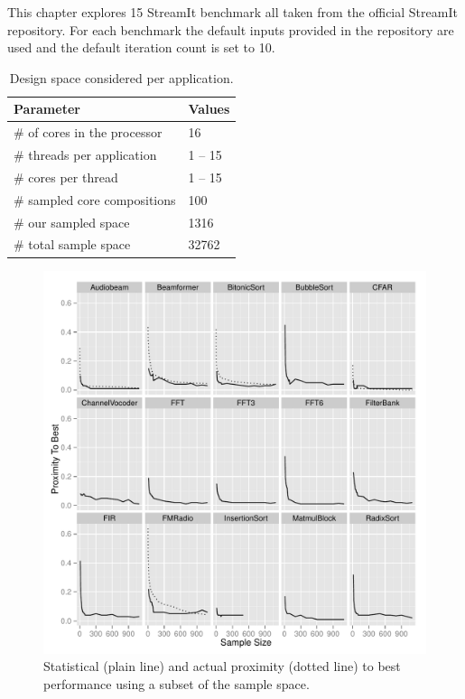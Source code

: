 This chapter explores 15 StreamIt benchmark  all taken from the official StreamIt repository.
For each benchmark the default inputs provided in the repository are used and the default iteration count is set to 10. 
\begin{table}
\centering
\begin{tabular} { p{5.2cm}  p{1.8cm} }
      \toprule
      \textbf{Parameter} & \textbf{Values} \\ \midrule
      \# of cores in the processor & 16 \\
      \# threads per application & 1 -- 15 \\
      \# cores per thread & 1 -- 15 \\ \midrule
      \# sampled core compositions & 100 \\ 
      \# our sampled space & 1316 \\
      \# total sample space & 32762 \\ \bottomrule
    \end{tabular}
  \caption{Design space considered per application.}
  \label{tab:space}
\end{table}

\begin{figure}[t]
  \centering
    \includegraphics[width=1\textwidth]{streamit-paper/graphics/ESCProx.pdf}
    \caption{Statistical (plain line) and actual proximity (dotted line) to best performance using a subset of the sample space.}\label{fig:prox}
\end{figure}

